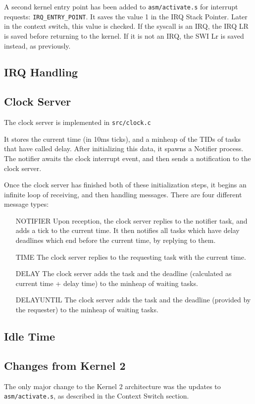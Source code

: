 \documentclass{article}
\begin{document}
    A second kernel entry point has been added to \verb|asm/activate.s| for interrupt requests: \verb|IRQ_ENTRY_POINT|. It saves the value 1 in the IRQ Stack Pointer. Later in the context switch, this value is checked. If the syscall is an IRQ, the IRQ LR is saved before returning to the kernel. If it is not an IRQ, the SWI Lr is saved instead, as previously.

\subsection{IRQ Handling}
\subsection{Clock Server}
The clock server is implemented in \verb|src/clock.c|

It stores the current time (in 10ms ticks), and a minheap of the TIDs of tasks that have called delay.
After initializing this data, it spawns a Notifier process. 
The notifier awaits the clock interrupt event, and then sends a notification to the clock server.

Once the clock server has finished both of these initialization steps, it begins an infinite loop of receiving, and then handling messages.
There are four different message types:
\begin{enumerate}
    \item[NOTIFIER] Upon reception, the clock server replies to the notifier task, and adds a tick to the current time.
    It then notifies all tasks which have delay deadlines which end before the current time, by replying to them.
    \item [TIME] The clock server replies to the requesting task with the current time.
    \item[DELAY] The clock server adds the task and the deadline (calculated as current time + delay time) to the minheap of waiting tasks.
    \item[DELAYUNTIL] The clock server adds the task and the deadline (provided by the requester) to the minheap of waiting tasks.
\end{enumerate}
\subsection{Idle Time}
\subsection{Changes from Kernel 2}
    The only major change to the Kernel $2$ architecture was the updates to \verb|asm/activate.s|, as described in the Context Switch section.
\end{document}
